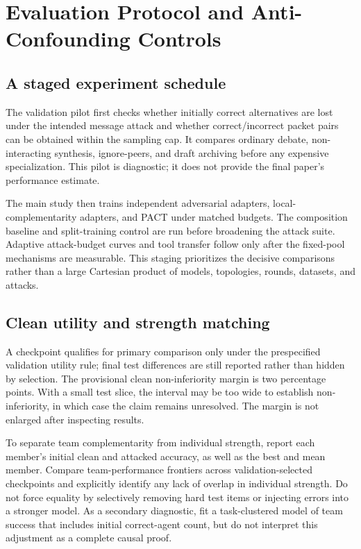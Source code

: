 \documentclass[10pt,twocolumn]{article}
\newcommand{\method}{\textsc{PACT}}
\begin{document}
\section{Evaluation Protocol and Anti-Confounding Controls}
\label{app:eval}
\subsection{A staged experiment schedule}
The validation pilot first checks whether initially correct alternatives are lost under the intended message attack and whether correct/incorrect packet pairs can be obtained within the sampling cap. It compares ordinary debate, non-interacting synthesis, ignore-peers, and draft archiving before any expensive specialization. This pilot is diagnostic; it does not provide the final paper's performance estimate.

The main study then trains independent adversarial adapters, local-complementarity adapters, and \method{} under matched budgets. The composition baseline and split-training control are run before broadening the attack suite. Adaptive attack-budget curves and tool transfer follow only after the fixed-pool mechanisms are measurable. This staging prioritizes the decisive comparisons rather than a large Cartesian product of models, topologies, rounds, datasets, and attacks.

\subsection{Clean utility and strength matching}
A checkpoint qualifies for primary comparison only under the prespecified validation utility rule; final test differences are still reported rather than hidden by selection. The provisional clean non-inferiority margin is two percentage points. With a small test slice, the interval may be too wide to establish non-inferiority, in which case the claim remains unresolved. The margin is not enlarged after inspecting results.

To separate team complementarity from individual strength, report each member's initial clean and attacked accuracy, as well as the best and mean member. Compare team-performance frontiers across validation-selected checkpoints and explicitly identify any lack of overlap in individual strength. Do not force equality by selectively removing hard test items or injecting errors into a stronger model. As a secondary diagnostic, fit a task-clustered model of team success that includes initial correct-agent count, but do not interpret this adjustment as a complete causal proof.
\end{document}
